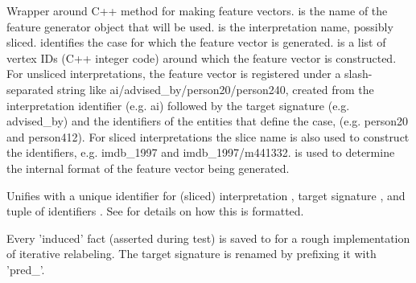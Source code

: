\begin{description}
Wrapper around C++ method for making feature vectors.
 is the name of the feature generator object that
will be used.  is the interpretation name, possibly sliced. 
identifies the case for which the feature vector is
generated.  is a list of vertex IDs (C++ integer code)
around which the feature vector is constructed. For unsliced
interpretations, the feature vector is registered under a
slash-separated string like ai/advised_by/person20/person240,
created from the interpretation identifier (e.g. ai) followed by the
target signature (e.g. advised_by) and the identifiers of the
entities that define the case, (e.g. person20 and person412). For
sliced interpretations the slice name is also used to construct the
identifiers, e.g. imdb_1997 and imdb_1997/m441332.  is used to
determine the internal format of the feature vector being generated.

Unifies  with a unique identifier for (sliced) interpretation
, target signature , and tuple of identifiers . See
 for details on how this is formatted.

Every 'induced' fact (asserted during test) is saved to  for
a rough implementation of iterative relabeling. The target signature
is renamed by prefixing it with 'pred_'.
\end{description}

